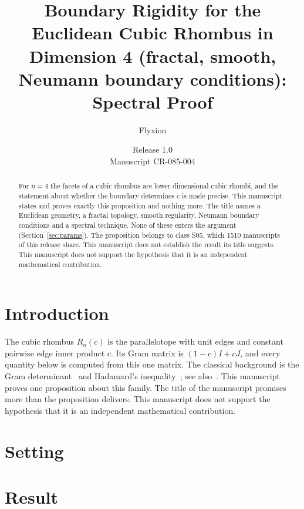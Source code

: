 \documentclass[11pt]{article}
\title{Boundary Rigidity for the Euclidean Cubic Rhombus in Dimension 4 (fractal, smooth, Neumann boundary conditions): Spectral Proof}
\author{Flyxion}
\date{Release 1.0\\ Manuscript CR-085-004}
\begin{document}
\maketitle
\begin{abstract}
For $n=4$ the facets of a cubic rhombus are lower dimensional cubic rhombi, and the statement about whether the boundary determines $c$ is made precise. This manuscript states and proves exactly this proposition and nothing more. The title names a Euclidean geometry, a fractal topology, smooth regularity, Neumann boundary conditions and a spectral technique. None of these enters the argument (Section~\ref{sec:params}). The proposition belongs to class S05, which 1510 manuscripts of this release share. This manuscript does not establish the result its title suggests. This manuscript does not support the hypothesis that it is an independent mathematical contribution.
\end{abstract}

\section{Introduction}
The cubic rhombus $R_n(c)$ is the parallelotope with unit edges and constant pairwise edge inner product $c$. Its Gram matrix is $(1-c)I+cJ$, and every quantity below is computed from this one matrix. The classical background is the Gram determinant~\cite{gram} and Hadamard's inequality~\cite{hadamard}; see also~\cite{hj}.
This manuscript proves one proposition about this family. The title of the manuscript promises more than the proposition delivers. This manuscript does not support the hypothesis that it is an independent mathematical contribution.

\section{Setting}


\section{Result}

\end{document}
